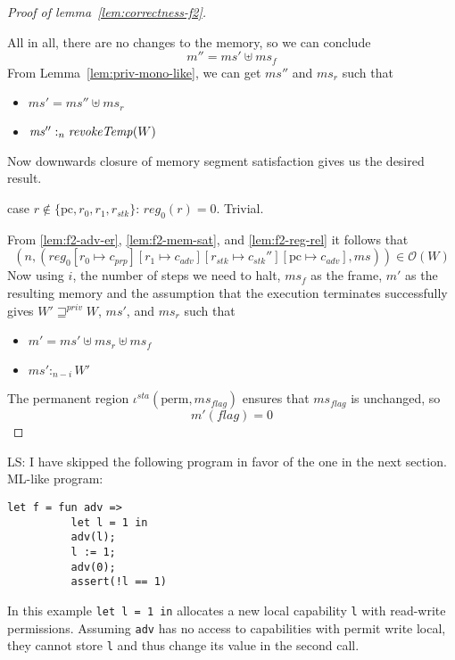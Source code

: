 \documentclass[a4paper]{article}
\newcommand{\update}[2]{[#1 \mapsto #2]}
\newcommand\lau[1]{{\color{purple} \sf \footnotesize {LS: #1}}\\}
\newcommand{\var}[1]{\mathit{#1}}
\newcommand{\hs}{\var{ms}}
\newcommand{\ms}{\hs}
\newcommand{\pcreg}{\mathrm{pc}}
\newcommand{\reg}{\var{reg}}
\newcommand{\heap}{\var{mem}}
\newcommand{\adv}{\var{adv}}
\newcommand{\stk}{\var{stk}}
\newcommand{\flag}{\var{flag}}
\newcommand{\sta}{\var{sta}}
\newcommand{\plainfun}[2]{
  \ifthenelse{\equal{#2}{}}
  {\mathit{#1}}
  {\mathit{#1}(#2)}
}
\newcommand{\revokeTemp}[1]{\plainfun{revokeTemp}{#1}}
\newcommand{\futurestr}{\mathbin{\sqsupseteq}^{\var{priv}}}
\newcommand{\heapSat}[3][\heap]{#1 :_{#2} #3}
\newcommand{\observations}{\mathcal{O}}
\newcommand{\npair}[2][n]{\left(#1,#2 \right)}
\newcommand{\plainview}[1]{\mathrm{#1}}
\newcommand{\perma}{\plainview{perm}}
\begin{document}
\begin{proof}[Proof of lemma~\ref{lem:correctness-f2}]
\begin{enumproof}[resume]
\begin{enumproof}
                    All in all, there are no changes to the memory, so we can conclude
                    \[
                      m'' = \ms' \uplus \ms_f
                    \]
                    From Lemma~\ref{lem:priv-mono-like}, we can get $\ms''$ and $\ms_r$ such that
                    \begin{itemize}
                    \item $\ms' = \ms'' \uplus \ms_r$
                    \item $\heapSat[\ms'']{n}{\revokeTemp{W}}$
                    \end{itemize}
                    Now downwards closure of memory segment satisfaction gives us the desired result.
                  \item case $r\not\in \{\pcreg,r_0,r_1,r_\stk\}$: $\reg_0(r) = 0$. Trivial.
                  \end{enumproof}
                \end{enumproof}
                From \ref{lem:f2-adv-er}, \ref{lem:f2-mem-sat}, and \ref{lem:f2-reg-rel} it follows that
                \[
                  \npair{(\reg_0\update{r_0}{c_{\var{prp}}}\update{r_1}{c_\adv}\update{r_\stk}{c_\stk''}\update{\pcreg}{c_\adv},\ms)} \in \observations(W)
                \]
                Now using $i$, the number of steps we need to halt, $\ms_f$ as the frame, $m'$ as the resulting memory and the assumption that the execution terminates successfully gives $W' \futurestr W$, $\ms'$, and $\ms_r$ such that
                \begin{itemize}
                \item $m' = \ms' \uplus\ms_r \uplus \ms_f$
                \item $\heapSat[\ms']{n-i}{W'}$
                \end{itemize}
                The permanent region $\iota^\sta (\perma,\ms_\flag)$ ensures that $\ms_\flag$ is unchanged, so
                \[
                  m'(\flag) = 0
                \]
              \end{proof}

              \lau{I have skipped the following program in favor of the one in the next section. }
              ML-like program:
\begin{verbatim}
let f = fun adv =>
          let l = 1 in
          adv(l);
          l := 1;
          adv(0);
          assert(!l == 1)
\end{verbatim}
              In this example \texttt{let l = 1 in} allocates a new local capability \texttt{l} with read-write permissions. Assuming \texttt{adv} has no access to capabilities with permit write local, they cannot store \texttt{l} and thus change its value in the second call.
\end{document}
